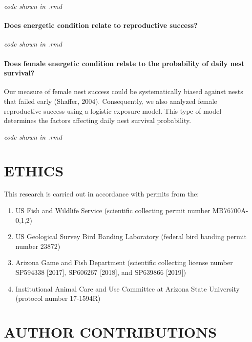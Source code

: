 \documentclass[
]{article}
\providecommand{\tightlist}{%
  \setlength{\itemsep}{0pt}\setlength{\parskip}{0pt}}
\begin{document}
\emph{code shown in .rmd}

\hypertarget{does-energetic-condition-relate-to-reproductive-success}{%
\paragraph{Does energetic condition relate to reproductive
success?}\label{does-energetic-condition-relate-to-reproductive-success}}

\emph{code shown in .rmd}

\hypertarget{does-female-energetic-condition-relate-to-the-probability-of-daily-nest-survival}{%
\paragraph{Does female energetic condition relate to the probability of
daily nest
survival?}\label{does-female-energetic-condition-relate-to-the-probability-of-daily-nest-survival}}

Our measure of female nest success could be systematically biased
against nests that failed early (Shaffer, 2004). Consequently, we also
analyzed female reproductive success using a logistic exposure model.
This type of model determines the factors affecting daily nest survival
probability.

\emph{code shown in .rmd}

\hypertarget{ethics}{%
\section{ETHICS}\label{ethics}}

This research is carried out in accordance with permits from the:

\begin{enumerate}
\def\labelenumi{\arabic{enumi})}
\tightlist
\item
  US Fish and Wildlife Service (scientific collecting permit number
  MB76700A-0,1,2)
\item
  US Geological Survey Bird Banding Laboratory (federal bird banding
  permit number 23872)
\item
  Arizona Game and Fish Department (scientific collecting license number
  SP594338 {[}2017{]}, SP606267 {[}2018{]}, and SP639866 {[}2019{]})
\item
  Institutional Animal Care and Use Committee at Arizona State
  University (protocol number 17-1594R)
\end{enumerate}

\hypertarget{author-contributions}{%
\section{AUTHOR CONTRIBUTIONS}\label{author-contributions}}
\end{document}
